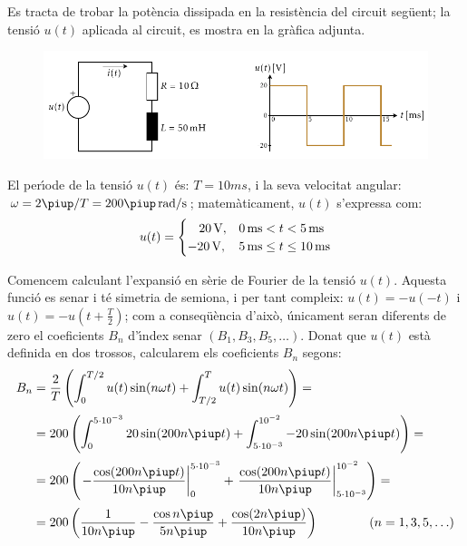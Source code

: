 \begin{exemple}

 Es tracta de trobar la pot\`{e}ncia
 dissipada en la resist\`{e}ncia del circuit seg\"{u}ent; la tensi\'{o} $u(t)$ aplicada al circuit,
 es mostra en la gr\`{a}fica adjunta.

\begin{figure}[h]
\centering
    \includegraphics{Imatges/Cap-Fourier-Exemple-Circuit.pdf}
\end{figure}

 El per\'{\i}ode de la tensi\'{o} $u(t)$ \'{e}s: $T=10\unit{ms}$, i la
seva velocitat angular: $\omega = 2\piup/T = 200\piup\unit{rad/s}$;
matem\`{a}ticament, $u(t)$ s'expressa com:
\[
u(t) = \begin{cases} \rule{3.2mm}{0pt} 20\unit{V}, & 0\unit{ms} < t < 5\unit{ms} \\
       -20\unit{V}, & 5\unit{ms} \leq t \leq 10\unit{ms} \end{cases}
\]

Comencem calculant l'expansi\'{o} en s\`{e}rie de Fourier de la tensi\'{o}
$u(t)$. Aquesta funci\'{o} es senar i t\'{e} simetria de semiona, i per tant
 compleix: $u(t)=-u(-t)$ i $u(t) = -u(t+\frac{T}{2})$; com a
conseq\"{u}\`{e}ncia d'aix\`{o}, \'{u}nicament seran diferents de zero el
coeficients $B_n$ d'\'{\i}ndex senar $(B_1,B_3,B_5,\ldots)$. Donat que
$u(t)$ est\`{a} definida en dos trossos, calcularem els coeficients
$B_n$ segons:
\[
\begin{split}
    B_n &= \frac{2}{T} \left( \int_0^{T/2} u(t) \sin(n \omega t) +
    \int_{T/2}^{T} u(t) \sin(n \omega t) \right) =\\[0.5ex]
    &= 200 \left( \int_0^{5\cdot 10^{-3}} 20 \sin(200 n \piup t) +
    \int_{5\cdot 10^{-3}}^{10^{-2}} -20 \sin(200 n \piup t) \right) =\\[0.5ex]
    &= 200 \left( \left. -\frac{\cos(200 n \piup t)}{10 n \piup}\right|_0^{5\cdot 10^{-3}}
    +  \left.\frac{\cos(200 n \piup t)}{10 n \piup}\right|_{5\cdot
    10^{-3}}^{10^{-2}}\right)=\\[0.5ex]
    &= 200\left( \frac{1}{10 n \piup} - \frac{\cos n \piup}{5 n \piup} +
    \frac{\cos (2 n \piup)}{10 n \piup}\right)
    \qquad\qquad(n=1,3,5,\ldots)
\end{split}
\]


\end{exemple}
